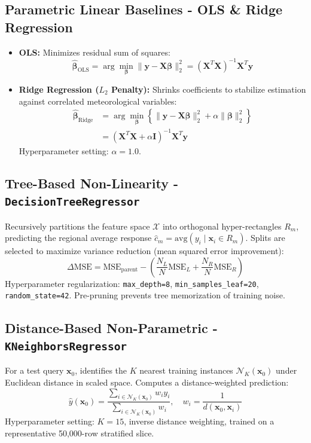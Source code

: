 \documentclass[a4paper,12pt,twocolumn]{article}
\begin{document}
\subsection{Parametric Linear Baselines - OLS \& Ridge Regression}
\begin{itemize}
    \item \textbf{OLS:} Minimizes residual sum of squares:
    \begin{equation}
    \hat{\boldsymbol{\beta}}_{\text{OLS}} = \arg\min_{\boldsymbol{\beta}} \|\mathbf{y} - \mathbf{X}\boldsymbol{\beta}\|_2^2 = (\mathbf{X}^T \mathbf{X})^{-1} \mathbf{X}^T \mathbf{y}
    \end{equation}
    \item \textbf{Ridge Regression ($L_2$ Penalty):} Shrinks coefficients to stabilize estimation against correlated meteorological variables:
    \begin{align}
    \hat{\boldsymbol{\beta}}_{\text{Ridge}} &= \arg\min_{\boldsymbol{\beta}} \left\{ \|\mathbf{y} - \mathbf{X}\boldsymbol{\beta}\|_2^2 + \alpha \|\boldsymbol{\beta}\|_2^2 \right\} \nonumber \\
    &= (\mathbf{X}^T \mathbf{X} + \alpha \mathbf{I})^{-1} \mathbf{X}^T \mathbf{y}
    \end{align}
    Hyperparameter setting: $\alpha = 1.0$.
\end{itemize}

\subsection{Tree-Based Non-Linearity - \texttt{DecisionTreeRegressor}}
Recursively partitions the feature space $\mathcal{X}$ into orthogonal hyper-rectangles $R_m$, predicting the regional average response $\hat{c}_m = \text{avg}(y_i \mid \mathbf{x}_i \in R_m)$. Splits are selected to maximize variance reduction (mean squared error improvement):
\begin{equation}
\Delta \text{MSE} = \text{MSE}_{\text{parent}} - \left( \frac{N_L}{N} \text{MSE}_L + \frac{N_R}{N} \text{MSE}_R \right)
\end{equation}
Hyperparameter regularization: \texttt{max\_depth=8}, \texttt{min\_samples\_leaf=20}, \texttt{random\_state=42}. Pre-pruning prevents tree memorization of training noise.

\subsection{Distance-Based Non-Parametric - \texttt{KNeighborsRegressor}}
For a test query $\mathbf{x}_0$, identifies the $K$ nearest training instances $\mathcal{N}_K(\mathbf{x}_0)$ under Euclidean distance in scaled space. Computes a distance-weighted prediction:
\begin{equation}
\hat{y}(\mathbf{x}_0) = \frac{\sum_{i \in \mathcal{N}_K(\mathbf{x}_0)} w_i y_i}{\sum_{i \in \mathcal{N}_K(\mathbf{x}_0)} w_i}, \quad w_i = \frac{1}{d(\mathbf{x}_0, \mathbf{x}_i)}
\end{equation}
Hyperparameter setting: $K = 15$, inverse distance weighting, trained on a representative 50,000-row stratified slice.
\end{document}
